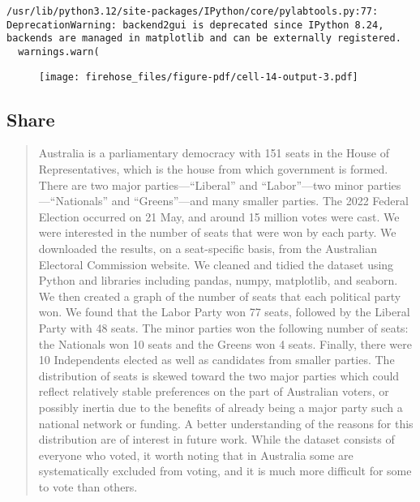 \documentclass[
  letterpaper,
  DIV=11,
  numbers=noendperiod]{scrreprt}
\begin{document}
\begin{verbatim}
/usr/lib/python3.12/site-packages/IPython/core/pylabtools.py:77: DeprecationWarning: backend2gui is deprecated since IPython 8.24, backends are managed in matplotlib and can be externally registered.
  warnings.warn(
\end{verbatim}

\begin{figure}[H]

{\centering \texttt{[image: firehose\_files/figure-pdf/cell-14-output-3.pdf]}

}

\end{figure}

\hypertarget{share}{%
\subsection{Share}\label{share}}

\begin{quote}
Australia is a parliamentary democracy with 151 seats in the House of
Representatives, which is the house from which government is formed.
There are two major parties---``Liberal'' and ``Labor''---two minor
parties---``Nationals'' and ``Greens''---and many smaller parties. The
2022 Federal Election occurred on 21 May, and around 15 million votes
were cast. We were interested in the number of seats that were won by
each party. We downloaded the results, on a seat-specific basis, from
the Australian Electoral Commission website. We cleaned and tidied the
dataset using Python and libraries including pandas, numpy, matplotlib,
and seaborn. We then created a graph of the number of seats that each
political party won. We found that the Labor Party won 77 seats,
followed by the Liberal Party with 48 seats. The minor parties won the
following number of seats: the Nationals won 10 seats and the Greens won
4 seats. Finally, there were 10 Independents elected as well as
candidates from smaller parties. The distribution of seats is skewed
toward the two major parties which could reflect relatively stable
preferences on the part of Australian voters, or possibly inertia due to
the benefits of already being a major party such a national network or
funding. A better understanding of the reasons for this distribution are
of interest in future work. While the dataset consists of everyone who
voted, it worth noting that in Australia some are systematically
excluded from voting, and it is much more difficult for some to vote
than others.
\end{quote}
\end{document}
